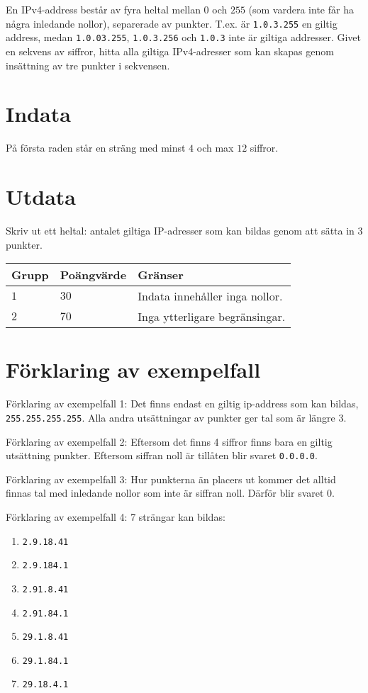 En IPv4-address består av fyra heltal mellan $0$ och $255$ (som vardera inte får ha några inledande nollor), separerade av punkter.
T.ex. är \texttt{1.0.3.255} en giltig address, medan \texttt{1.0.03.255}, \texttt{1.0.3.256} och \texttt{1.0.3} inte är giltiga addresser.
Givet en sekvens av siffror, hitta alla giltiga IPv4-adresser som kan skapas genom insättning av tre punkter i sekvensen.

\section*{Indata}
På första raden står en sträng med minst $4$ och max $12$ siffror.

\section*{Utdata}
Skriv ut ett heltal: antalet giltiga IP-adresser som kan bildas genom att sätta in 3 punkter.


\noindent
\begin{tabular}{| l | l | p{12cm} |}
  \hline
  Grupp & Poängvärde & Gränser \\ \hline
  $1$    & $30$        & Indata innehåller inga nollor. \\ \hline 
  $2$    & $70$        & Inga ytterligare begränsingar. \\ \hline 
\end{tabular}


\section*{Förklaring av exempelfall}
Förklaring av exempelfall 1: Det finns endast en giltig ip-address som kan bildas, \texttt{255.255.255.255}. Alla andra utsättningar av punkter ger tal som är längre 3.

Förklaring av exempelfall 2: Eftersom det finns 4 siffror finns bara en giltig utsättning punkter. Eftersom siffran noll är tillåten blir svaret \texttt{0.0.0.0}.

Förklaring av exempelfall 3: Hur punkterna än placers ut kommer det alltid finnas tal med inledande nollor som inte är siffran noll. Därför blir svaret 0.

Förklaring av exempelfall 4: 7 strängar kan bildas$\colon$
\begin{enumerate}
    \item \texttt{2.9.18.41}
    \item \texttt{2.9.184.1}
    \item \texttt{2.91.8.41}
    \item \texttt{2.91.84.1}
    \item \texttt{29.1.8.41}
    \item \texttt{29.1.84.1}
    \item \texttt{29.18.4.1}
\end{enumerate}